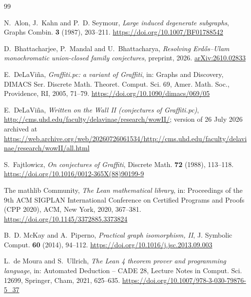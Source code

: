 \documentclass[11pt]{amsart}
\theoremstyle{definition}
\theoremstyle{remark}
\numberwithin{equation}{section}
\providecommand{\doi}[1]{\url{https://doi.org/#1}}
\begin{document}
{\raggedright
\begin{thebibliography}{99}

N.~Alon, J.~Kahn and P.~D. Seymour, \emph{Large induced degenerate subgraphs}, Graphs Combin. \textbf{3} (1987), 203--211. \doi{10.1007/BF01788542}

D.~Bhattacharjee, P.~Mandal and U.~Bhattacharya, \emph{Resolving Erd\H{o}s--Ulam monochromatic union-closed family conjectures}, preprint, 2026. \href{https://arxiv.org/abs/2610.02833}{arXiv:2610.02833}

E.~DeLaVi\~na, \emph{Graffiti.pc: a variant of Graffiti}, in: Graphs and Discovery, DIMACS Ser. Discrete Math. Theoret. Comput. Sci. 69, Amer. Math. Soc., Providence, RI, 2005, 71--79. \doi{10.1090/dimacs/069/05}

E.~DeLaVi\~na, \emph{Written on the Wall II (conjectures of Graffiti.pc)}, \url{http://cms.uhd.edu/faculty/delavinae/research/wowII/}; version of 26 July 2026 archived at \url{https://web.archive.org/web/20260726061534/http://cms.uhd.edu/faculty/delavinae/research/wowII/all.html}

S.~Fajtlowicz, \emph{On conjectures of Graffiti}, Discrete Math. \textbf{72} (1988), 113--118. \doi{10.1016/0012-365X(88)90199-9}

The mathlib Community, \emph{The Lean mathematical library}, in: Proceedings of the 9th ACM SIGPLAN International Conference on Certified Programs and Proofs (CPP 2020), ACM, New York, 2020, 367--381. \doi{10.1145/3372885.3373824}

B.~D. McKay and A.~Piperno, \emph{Practical graph isomorphism, II}, J. Symbolic Comput. \textbf{60} (2014), 94--112. \doi{10.1016/j.jsc.2013.09.003}

L.~de Moura and S.~Ullrich, \emph{The Lean 4 theorem prover and programming language}, in: Automated Deduction -- CADE 28, Lecture Notes in Comput. Sci. 12699, Springer, Cham, 2021, 625--635. \doi{10.1007/978-3-030-79876-5_37}

\end{thebibliography}
}
\end{document}
